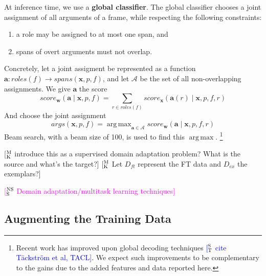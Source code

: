 \documentclass[11pt,a4paper]{article}
\DeclareMathOperator*{\argmax}{arg\,max}
\newcommand{\ensuretext}[1]{#1}
\newcommand{\nssmarker}{\ensuretext{\textcolor{magenta}{\ensuremath{^{\textsc{NS}}_{\textsc{S}}}}}}
\newcommand{\mkmarker}{\ensuretext{\textcolor{mdgreen}{\ensuremath{^{\textsc{M}}_{\textsc{K}}}}}}
\newcommand{\stmarker}{\ensuretext{\textcolor{blue}{\ensuremath{^{\textsc{S}}_{\textsc{T}}}}}}
\newcommand{\arkcomment}[3]{\ensuretext{\textcolor{#3}{[#1 #2]}}}
\newcommand{\nss}[1]{\arkcomment{\nssmarker}{#1}{magenta}}
\newcommand{\mk}[1]{\arkcomment{\mkmarker}{#1}{mdgreen}}
\newcommand{\st}[1]{\arkcomment{\stmarker}{#1}{blue}}
\newcommand{\term}[1]{\textbf{#1}} %
\begin{document}
At inference time, we use a \term{global classifier}.
The global classifier chooses a joint assignment of all arguments of a frame, while respecting the following constraints:
\begin{enumerate}
  \item a role may be assigned to at most one span, and
  \item spans of overt arguments must not overlap.
\end{enumerate}
Concretely, let a joint assigment be represented as a function $\mathbf{a}: \textit{roles}(f) \rightarrow \textit{spans}(\mathbf{x}, p, f)$, %
 and let $\mathcal{A}$ be the set of all non-overlapping assignments.
We give $\mathbf{a}$ the score
\begin{equation}
\textit{score}_{\mathbf{w}}(\mathbf{a} \mid \mathbf{x}, p, f) =
    \sum_{r \in \textit{roles}(f)}{\textit{score}_\mathbf{x}(\mathbf{a}(r) \mid \mathbf{x}, p, f, r)}
\end{equation}
And choose the joint assignment
\begin{equation}
\textit{args}(\mathbf{x}, p, f) =
    \argmax_{\mathbf{a} \in \mathcal{A}} {
        \textit{score}_{\mathbf{w}}(\mathbf{a} \mid \mathbf{x}, p, f, r)
    }
\end{equation}
Beam search, with a beam size of 100, is used to find this $\argmax$.%
\footnote{Recent work has improved upon global decoding techniques \st{cite Täckström et al, TACL}.
We expect such improvements to be complementary to the gains due to the added features and data reported here.}

\mk{introduce this as a supervised domain adaptation problem? What is the source and what's the target?}
\mk{Let $D_{ft}$ represent the FT data and $D_{ex}$ the exemplars?}


\nss{Domain adaptation/multitask learning techniques}

\subsection{Augmenting the Training Data}
\label{sec:aug_data}
\end{document}
